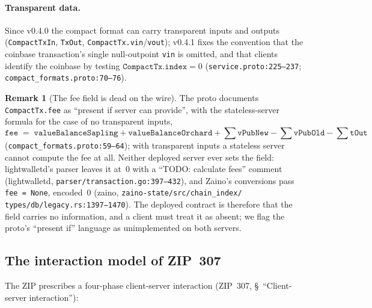 \documentclass[11pt,a4paper]{article}
\theoremstyle{definition}
\newtheorem{remark}[theorem]{Remark}
\begin{document}
\paragraph{Transparent data.} Since v0.4.0 the compact format can carry
transparent inputs and outputs (\texttt{CompactTxIn}, \texttt{TxOut},
\texttt{CompactTx.vin}/\texttt{vout}); v0.4.1 fixes the convention that
the coinbase transaction's single null-outpoint \texttt{vin} is omitted,
and that clients identify the coinbase by testing
$\mathtt{CompactTx.index} = 0$ (\texttt{service.proto:225--237};
\texttt{compact\_formats.proto:70--76}).

\begin{remark}[The fee field is dead on the wire]\label{rem:sync-fee}
The proto documents \texttt{CompactTx.fee} as ``present if server can
provide'', with the stateless-server formula for the case of no
transparent inputs,
\[
\mathtt{fee} \;=\; \mathtt{valueBalanceSapling} +
\mathtt{valueBalanceOrchard} + \textstyle\sum \mathtt{vPubNew} -
\sum \mathtt{vPubOld} - \sum \mathtt{tOut}
\]
(\texttt{compact\_formats.proto:59--64}); with transparent inputs a
stateless server cannot compute the fee at all. Neither deployed server
ever sets the field: lightwalletd's parser leaves it at~0 with a
``TODO: calculate fees'' comment (\textsf{lightwalletd},
\texttt{parser/transaction.go:397--432}), and Zaino's conversions pass
\texttt{fee = None}, encoded~0 (\textsf{zaino},
\texttt{zaino-state/src/chain\_index/}\allowbreak
\texttt{types/db/legacy.rs:1397--1470}).
The deployed contract is therefore that the field carries no information,
and a client must treat it as absent; we flag the proto's ``present if''
language as unimplemented on both servers.
\end{remark}

\subsection{The interaction model of ZIP~307}\label{sec:sync-interaction}

The ZIP prescribes a four-phase client-server interaction (ZIP~307,
\S~``Client-server interaction''):
\end{document}
